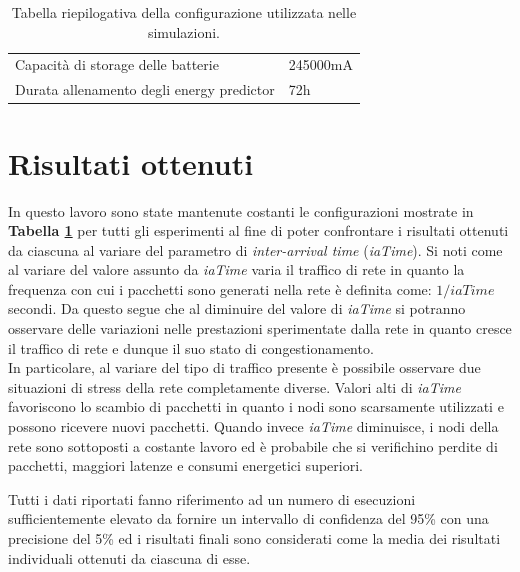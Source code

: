 \documentclass[binding=0.6cm,TFA]{sapthesis}
\begin{document}
\begin{table}[h]
\begin{tabular}{ |p{8cm}|p{4cm}|  }
        Capacità di storage delle batterie              & 245000mA                                  \\
        Durata allenamento degli energy predictor       & 72h                                       \\
        \hline
    \end{tabular}
    \centering
    \vspace*{5mm}
    \caption{Tabella riepilogativa della configurazione utilizzata nelle simulazioni.}
    \label{configs}
\end{table}

\section{Risultati ottenuti}

In questo lavoro sono state mantenute costanti le configurazioni mostrate in \textbf{Tabella \ref{configs}} per tutti gli esperimenti al fine di poter
confrontare i risultati ottenuti da ciascuna al variare del parametro di \emph{inter-arrival time} (\emph{iaTime}). Si noti come al variare del valore assunto
da \emph{iaTime} varia il traffico di rete in quanto la frequenza con cui i pacchetti sono generati nella rete è definita come: $1/iaTime$ secondi.
Da questo segue che al diminuire del valore di \emph{iaTime} si potranno osservare delle variazioni nelle prestazioni sperimentate dalla rete in quanto
cresce il traffico di rete e dunque il suo stato di congestionamento.\\

In particolare, al variare del tipo di traffico presente è possibile osservare due situazioni di stress della rete completamente diverse. Valori alti di \emph{iaTime}
favoriscono lo scambio di pacchetti in quanto i nodi sono scarsamente utilizzati e possono ricevere nuovi pacchetti. Quando invece \emph{iaTime} diminuisce, i
nodi della rete sono sottoposti a costante lavoro ed è probabile che si verifichino perdite di pacchetti, maggiori latenze e consumi energetici superiori.

\newpage

Tutti i dati riportati fanno riferimento ad un numero di esecuzioni sufficientemente elevato da fornire un intervallo di confidenza del 95\% con una precisione
del 5\% ed i risultati finali sono considerati come la media dei risultati individuali ottenuti da ciascuna di esse.\\
\end{document}
